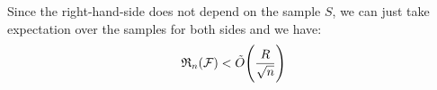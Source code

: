 \begin{proof*}
    \noindent Since the right-hand-side does not depend on the sample $S$, we can just take expectation over the samples for both sides and we have:
    \begin{align*}
        \mathfrak{R}_n(\mathcal{F}) < \tilde O\Bigg(  \frac{R}{\sqrt n}  \Bigg)
    \end{align*}
\end{proof*}

